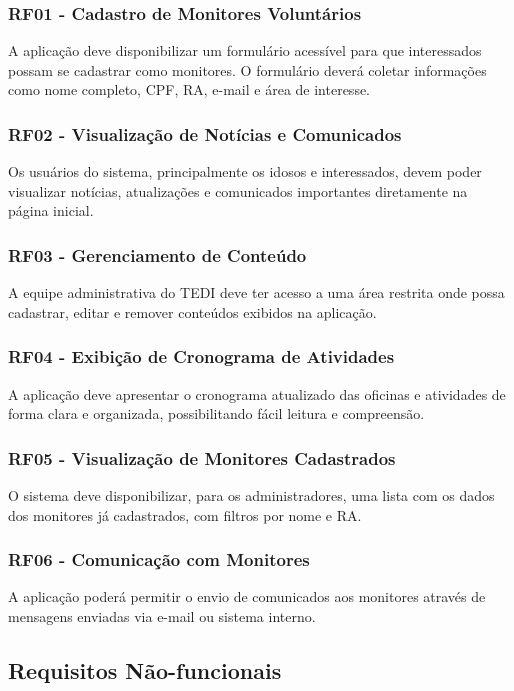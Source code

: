 \documentclass[a4paper,12pt]{article}
\begin{document}
\subsubsection*{RF01 - Cadastro de Monitores Voluntários}
A aplicação deve disponibilizar um formulário acessível para que interessados possam se cadastrar como monitores. O formulário deverá coletar informações como nome completo, CPF, RA, e-mail e área de interesse.

\subsubsection*{RF02 - Visualização de Notícias e Comunicados}
Os usuários do sistema, principalmente os idosos e interessados, devem poder visualizar notícias, atualizações e comunicados importantes diretamente na página inicial.

\subsubsection*{RF03 - Gerenciamento de Conteúdo}
A equipe administrativa do TEDI deve ter acesso a uma área restrita onde possa cadastrar, editar e remover conteúdos exibidos na aplicação.

\subsubsection*{RF04 - Exibição de Cronograma de Atividades}
A aplicação deve apresentar o cronograma atualizado das oficinas e atividades de forma clara e organizada, possibilitando fácil leitura e compreensão.

\subsubsection*{RF05 - Visualização de Monitores Cadastrados}
O sistema deve disponibilizar, para os administradores, uma lista com os dados dos monitores já cadastrados, com filtros por nome e RA.

\subsubsection*{RF06 - Comunicação com Monitores}
A aplicação poderá permitir o envio de comunicados aos monitores através de mensagens enviadas via e-mail ou sistema interno.

\subsection{Requisitos Não-funcionais}
\end{document}
